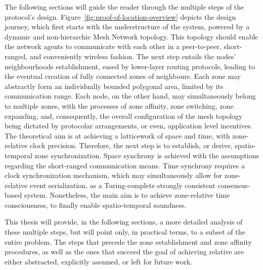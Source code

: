 The following sections will guide the reader through the multiple steps of the protocol's design. Figure~\ref{fig:proof-of-location-overview} depicts the design journey, which first starts with the understructure of the system, powered by a dynamic and non-hierarchic Mesh Network topology. This topology should enable the network agents to communicate with each other in a peer-to-peer, short-ranged, and conveniently wireless fashion. The next step entails the nodes' neighbourhoods establishment, eased by lower-layer routing protocols, leading to the eventual creation of fully connected zones of neighbours. Each zone may abstractly form an individually bounded polygonal area, limited by its communication range. Each node, on the other hand, may simultaneously belong to multiple zones, with the processes of zone affinity, zone switching, zone expanding, and, consequently, the overall configuration of the mesh topology being dictated by protocolar arrangements, or even, application level incentives. The theoretical aim is at achieving a latticework of space and time, with zone-relative clock precision. Therefore, the next step is to establish, or derive, spatio-temporal zone synchronization. Space synchrony is achieved with the assumptions regarding the short-ranged communication means. Time synchrony requires a clock synchronization mechanism, which may simultaneously allow for zone-relative event serialization, as a Turing-complete strongly consistent consensus-based system. Nonetheless, the main aim is to achieve zone-relative time consciousness, to finally enable spatio-temporal soundness.

This thesis will provide, in the following sections, a more detailed analysis of these multiple steps, but will point only, in practical terms, to a subset of the entire problem. The steps that precede the zone establishment and zone affinity procedures, as well as the ones that succeed the goal of achieving relative \pol{} are either abstracted, explicitly assumed, or left for future work.